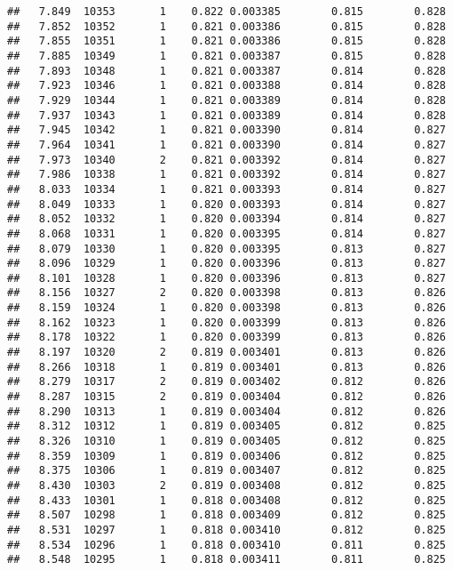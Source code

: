 \documentclass[
]{book}
\begin{document}
\begin{verbatim}
##   7.849  10353       1    0.822 0.003385        0.815        0.828
##   7.852  10352       1    0.821 0.003386        0.815        0.828
##   7.855  10351       1    0.821 0.003386        0.815        0.828
##   7.885  10349       1    0.821 0.003387        0.815        0.828
##   7.893  10348       1    0.821 0.003387        0.814        0.828
##   7.923  10346       1    0.821 0.003388        0.814        0.828
##   7.929  10344       1    0.821 0.003389        0.814        0.828
##   7.937  10343       1    0.821 0.003389        0.814        0.828
##   7.945  10342       1    0.821 0.003390        0.814        0.827
##   7.964  10341       1    0.821 0.003390        0.814        0.827
##   7.973  10340       2    0.821 0.003392        0.814        0.827
##   7.986  10338       1    0.821 0.003392        0.814        0.827
##   8.033  10334       1    0.821 0.003393        0.814        0.827
##   8.049  10333       1    0.820 0.003393        0.814        0.827
##   8.052  10332       1    0.820 0.003394        0.814        0.827
##   8.068  10331       1    0.820 0.003395        0.814        0.827
##   8.079  10330       1    0.820 0.003395        0.813        0.827
##   8.096  10329       1    0.820 0.003396        0.813        0.827
##   8.101  10328       1    0.820 0.003396        0.813        0.827
##   8.156  10327       2    0.820 0.003398        0.813        0.826
##   8.159  10324       1    0.820 0.003398        0.813        0.826
##   8.162  10323       1    0.820 0.003399        0.813        0.826
##   8.178  10322       1    0.820 0.003399        0.813        0.826
##   8.197  10320       2    0.819 0.003401        0.813        0.826
##   8.266  10318       1    0.819 0.003401        0.813        0.826
##   8.279  10317       2    0.819 0.003402        0.812        0.826
##   8.287  10315       2    0.819 0.003404        0.812        0.826
##   8.290  10313       1    0.819 0.003404        0.812        0.826
##   8.312  10312       1    0.819 0.003405        0.812        0.825
##   8.326  10310       1    0.819 0.003405        0.812        0.825
##   8.359  10309       1    0.819 0.003406        0.812        0.825
##   8.375  10306       1    0.819 0.003407        0.812        0.825
##   8.430  10303       2    0.819 0.003408        0.812        0.825
##   8.433  10301       1    0.818 0.003408        0.812        0.825
##   8.507  10298       1    0.818 0.003409        0.812        0.825
##   8.531  10297       1    0.818 0.003410        0.812        0.825
##   8.534  10296       1    0.818 0.003410        0.811        0.825
##   8.548  10295       1    0.818 0.003411        0.811        0.825

\end{verbatim}
\end{document}
